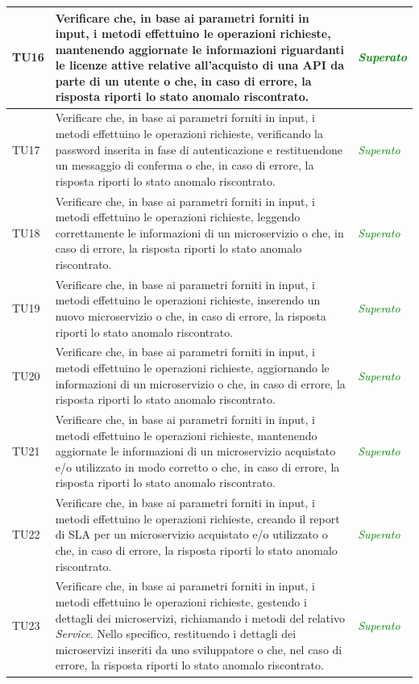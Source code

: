 \begin{longtable}{|>{\centering\arraybackslash}p{1.5cm}|>{\centering\arraybackslash}p{8cm} | >{\centering\arraybackslash}p{3.8cm}|}
		\hypertarget{TU16}{TU16} & Verificare che, in base ai parametri forniti in input, i metodi effettuino le operazioni richieste, mantenendo aggiornate le informazioni riguardanti le licenze attive relative all'acquisto di una API da parte di un utente o che, in caso di errore, la risposta riporti lo stato anomalo riscontrato. & \textcolor{Green}{\textit{Superato}}\\ \hline
		\hypertarget{TU17}{TU17} & Verificare che, in base ai parametri forniti in input, i metodi effettuino le operazioni richieste, verificando la password inserita in fase di autenticazione e restituendone un messaggio di conferma o che, in caso di errore, la risposta riporti lo stato anomalo riscontrato. & \textcolor{Green}{\textit{Superato}}\\ \hline
		\hypertarget{TU18}{TU18} & Verificare che, in base ai parametri forniti in input, i metodi effettuino le operazioni richieste, leggendo correttamente le informazioni di un microservizio o che, in caso di errore, la risposta riporti lo stato anomalo riscontrato. & \textcolor{Green}{\textit{Superato}}\\ \hline	
		\hypertarget{TU19}{TU19} & Verificare che, in base ai parametri forniti in input, i metodi effettuino le operazioni richieste, inserendo un nuovo microservizio o che, in caso di errore, la risposta riporti lo stato anomalo riscontrato. & \textcolor{Green}{\textit{Superato}}\\ \hline	
		\hypertarget{TU20}{TU20} & Verificare che, in base ai parametri forniti in input, i metodi effettuino le operazioni richieste, aggiornando le informazioni di un microservizio o che, in caso di errore, la risposta riporti lo stato anomalo riscontrato. & \textcolor{Green}{\textit{Superato}}\\ \hline		
		\hypertarget{TU21}{TU21} & Verificare che, in base ai parametri forniti in input, i metodi effettuino le operazioni richieste, mantenendo aggiornate le informazioni di un microservizio acquistato e/o utilizzato in modo corretto o che, in caso di errore, la risposta riporti lo stato anomalo riscontrato. & \textcolor{Green}{\textit{Superato}}\\ \hline
		\hypertarget{TU22}{TU22} & Verificare che, in base ai parametri forniti in input, i metodi effettuino le operazioni richieste, creando il report di SLA per un microservizio acquistato e/o utilizzato o che, in caso di errore, la risposta riporti lo stato anomalo riscontrato. & \textcolor{Green}{\textit{Superato}}\\ \hline
		\hypertarget{TU23}{TU23} & Verificare che, in base ai parametri forniti in input, i metodi effettuino le operazioni richieste, gestendo i dettagli dei microservizi, richiamando i metodi del relativo \textit{Service}. Nello specifico, restituendo i dettagli dei microservizi inseriti da uno sviluppatore o che, nel caso di errore, la risposta riporti lo stato anomalo riscontrato. & \textcolor{Green}{\textit{Superato}}\\ \hline

\end{longtable}
